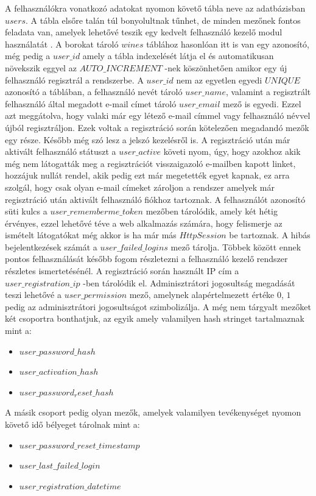 \documentclass[12pt]{report}
\theoremstyle{definition}
\begin{document}
	A felhasználókra vonatkozó adatokat nyomon követő tábla neve az adatbázisban $users$. A tábla elsőre talán túl bonyolultnak tűnhet, de minden mezőnek fontos feladata van, amelyek lehetővé teszik egy kedvelt felhasználó kezelő modul használatát \cite{php-login}. A borokat tároló $wines$ táblához hasonlóan itt is van egy azonosító, még pedig a $user\_id$ amely a tábla indexelését látja el és automatikusan növekszik eggyel az $AUTO\_INCREMENT$ -nek köszönhetően amikor egy új felhasználó regisztrál a rendszerbe. A $user\_id$ nem az egyetlen egyedi $UNIQUE$ azonosító a táblában, a felhasználó nevét tároló $user\_name$, valamint a regisztrált felhasználó által megadott e-mail címet tároló $user\_email$ mező is egyedi. Ezzel azt meggátolva, hogy valaki már egy létező e-mail címmel vagy felhasználó névvel újból regisztráljon. Ezek voltak a regisztráció során kötelezően megadandó mezők egy része. Később még szó lesz a jelszó kezelésről is. A regisztráció után már aktivált felhasználó státuszt a $user\_active$ követi nyom, úgy, hogy azokhoz akik még nem látogatták meg a regisztrációt visszaigazoló e-mailben kapott linket, hozzájuk nullát rendel, akik pedig ezt már megetették egyet kapnak, ez arra szolgál, hogy csak olyan e-mail címeket zároljon a rendszer amelyek már regisztráció után aktivált felhasználó fiókhoz tartoznak. A felhasználót azonosító süti kulcs a $user\_rememberme\_token$ mezőben tárolódik, amely két hétig érvényes, ezzel lehetővé téve a web alkalmazás számára, hogy felismerje az ismételt látogatókat még akkor is ha már más $HttpSession$ be tartoznak. A hibás bejelentkezések számát a $user\_failed\_logins$ mező tárolja. Többek között ennek pontos felhasználását később fogom részletezni a felhasználó kezelő rendszer részletes ismertetésénél. A regisztráció során használt IP cím a $user\_registration\_ip$ -ben tárolódik el. Adminisztrátori jogosultság megadását teszi lehetővé a $user\_permission$ mező, amelynek alapértelmezett értéke $0$, $1$ pedig az adminisztrátori jogosultságot szimbolizálja. A még nem tárgyalt mezőket két csoportra bonthatjuk, az egyik amely valamilyen hash stringet tartalmaznak mint a: 
	\begin{itemize}
		\item$user\_password\_hash$
		\item$user\_activation\_hash$
		\item$user\_password_reset\_hash$
	\end{itemize}
	A másik csoport pedig olyan mezők, amelyek valamilyen tevékenységet nyomon követő idő bélyeget tárolnak mint a: 
	\begin{itemize}
		\item$user\_password\_reset\_timestamp$
		\item$user\_last\_failed\_login$
		\item$user\_registration\_datetime$ 
	\end{itemize}
\end{document}
